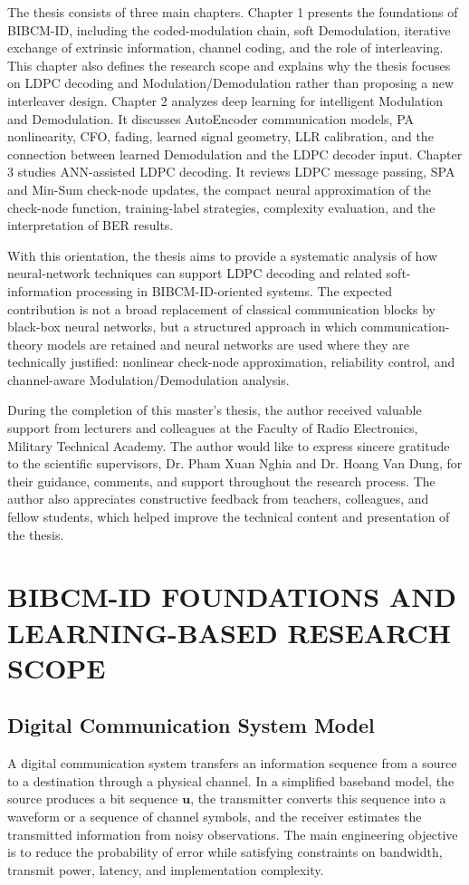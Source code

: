 The thesis consists of three main chapters. Chapter 1 presents the foundations of BIBCM-ID, including the coded-modulation chain, soft Demodulation, iterative exchange of extrinsic information, channel coding, and the role of interleaving. This chapter also defines the research scope and explains why the thesis focuses on LDPC decoding and Modulation/Demodulation rather than proposing a new interleaver design. Chapter 2 analyzes deep learning for intelligent Modulation and Demodulation. It discusses AutoEncoder communication models, PA nonlinearity, CFO, fading, learned signal geometry, LLR calibration, and the connection between learned Demodulation and the LDPC decoder input. Chapter 3 studies ANN-assisted LDPC decoding. It reviews LDPC message passing, SPA and Min-Sum check-node updates, the compact neural approximation of the check-node function, training-label strategies, complexity evaluation, and the interpretation of BER results.

With this orientation, the thesis aims to provide a systematic analysis of how neural-network techniques can support LDPC decoding and related soft-information processing in BIBCM-ID-oriented systems. The expected contribution is not a broad replacement of classical communication blocks by black-box neural networks, but a structured approach in which communication-theory models are retained and neural networks are used where they are technically justified: nonlinear check-node approximation, reliability control, and channel-aware Modulation/Demodulation analysis.

During the completion of this master's thesis, the author received valuable support from lecturers and colleagues at the Faculty of Radio Electronics, Military Technical Academy. The author would like to express sincere gratitude to the scientific supervisors, Dr. Pham Xuan Nghia and Dr. Hoang Van Dung, for their guidance, comments, and support throughout the research process. The author also appreciates constructive feedback from teachers, colleagues, and fellow students, which helped improve the technical content and presentation of the thesis.

\chapter[\textbf{BIBCM-ID FOUNDATIONS AND RESEARCH SCOPE}]{BIBCM-ID FOUNDATIONS AND LEARNING-BASED RESEARCH SCOPE}
\section{Digital Communication System Model}
A digital communication system transfers an information sequence from a source to a destination through a physical channel. In a simplified baseband model, the source produces a bit sequence $\mathbf{u}$, the transmitter converts this sequence into a waveform or a sequence of channel symbols, and the receiver estimates the transmitted information from noisy observations. The main engineering objective is to reduce the probability of error while satisfying constraints on bandwidth, transmit power, latency, and implementation complexity.

